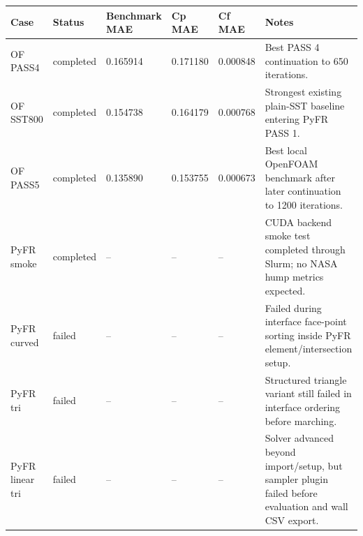 \begin{tabular}{p{1.8cm} p{1.25cm} p{1.45cm} p{1.35cm} p{1.35cm} p{6.0cm}}
\toprule
Case & Status & Benchmark MAE & Cp MAE & Cf MAE & Notes\\
\midrule
OF PASS4 & completed & 0.165914 & 0.171180 & 0.000848 & Best PASS 4 continuation to 650 iterations.\\
OF SST800 & completed & 0.154738 & 0.164179 & 0.000768 & Strongest existing plain-SST baseline entering PyFR PASS 1.\\
OF PASS5 & completed & 0.135890 & 0.153755 & 0.000673 & Best local OpenFOAM benchmark after later continuation to 1200 iterations.\\
PyFR smoke & completed & -- & -- & -- & CUDA backend smoke test completed through Slurm; no NASA hump metrics expected.\\
PyFR curved & failed & -- & -- & -- & Failed during interface face-point sorting inside PyFR element/intersection setup.\\
PyFR tri & failed & -- & -- & -- & Structured triangle variant still failed in interface ordering before marching.\\
PyFR linear tri & failed & -- & -- & -- & Solver advanced beyond import/setup, but sampler plugin failed before evaluation and wall CSV export.\\
\bottomrule
\end{tabular}